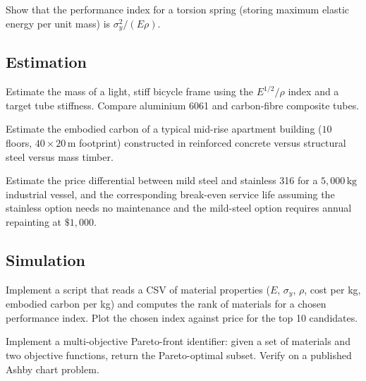 \begin{exercise}
Show that the performance index for a torsion spring (storing maximum
elastic energy per unit mass) is $\sigma_y^2 / (E \rho)$.
\end{exercise}

\subsection*{Estimation}

\begin{exercise}
Estimate the mass of a light, stiff bicycle frame using the
$E^{1/2}/\rho$ index and a target tube stiffness. Compare aluminium
6061 and carbon-fibre composite tubes.
\end{exercise}

\begin{exercise}
Estimate the embodied carbon of a typical mid-rise apartment building
($10$ floors, $40 \times 20\,\text{m}$ footprint) constructed in
reinforced concrete versus structural steel versus mass timber.
\end{exercise}

\begin{exercise}
Estimate the price differential between mild steel and stainless 316
for a $5{,}000\,\text{kg}$ industrial vessel, and the corresponding
break-even service life assuming the stainless option needs no
maintenance and the mild-steel option requires annual repainting at
$\$1{,}000$.
\end{exercise}

\subsection*{Simulation}

\begin{exercise}
Implement a script that reads a CSV of material properties ($E$,
$\sigma_y$, $\rho$, cost per kg, embodied carbon per kg) and computes
the rank of materials for a chosen performance index. Plot the chosen
index against price for the top 10 candidates.
\end{exercise}

\begin{exercise}
Implement a multi-objective Pareto-front identifier: given a set of
materials and two objective functions, return the Pareto-optimal
subset. Verify on a published Ashby chart problem.
\end{exercise}

